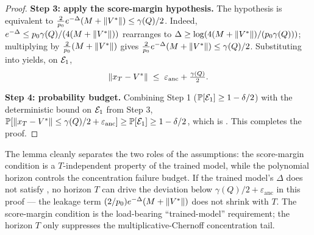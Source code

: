\begin{proof}
\noindent\textbf{Step 3: apply the score-margin hypothesis.}
The hypothesis  is equivalent to
$\tfrac{2}{p_0} e^{-\Delta}(M + \left\| V^* \right\|) \le \gamma(Q)/2$.
Indeed,
$e^{-\Delta} \le p_0 \gamma(Q) / (4(M + \left\| V^* \right\|))$ rearranges to
$\Delta \ge \log(4(M + \left\| V^* \right\|)/(p_0 \gamma(Q)))$; multiplying by
$\tfrac{2}{p_0}(M + \left\| V^* \right\|)$ gives
$\tfrac{2}{p_0} e^{-\Delta}(M + \left\| V^* \right\|) \le \gamma(Q)/2$.
Substituting into  yields, on $\mathcal{E}_1$,
\begin{align*}
   \left\| x_T - V^* \right\|
   \;\le\; \varepsilon_{\mathrm{anc}} + \tfrac{\gamma(Q)}{2}.
\end{align*}

\noindent\textbf{Step 4: probability budget.}
Combining Step 1 ($\mathbb{P}[\mathcal{E}_1] \ge 1 - \delta/2$) with the
deterministic bound on $\mathcal{E}_1$ from Step 3,
$\mathbb{P}[\left\| x_T - V^* \right\| \le \gamma(Q)/2 + \varepsilon_{\mathrm{anc}}]
\ge \mathbb{P}[\mathcal{E}_1] \ge 1 - \delta/2$, which is
. This completes the proof.
\end{proof}

\begin{remark}\label{rem:T_polynomial_remark}
The lemma cleanly separates the two roles of the assumptions: the
score-margin condition  is a $T$-independent
property of the trained model, while the polynomial horizon
 controls the concentration failure budget.
If the trained model's $\Delta$ does not satisfy
, no horizon $T$ can drive the deviation below
$\gamma(Q)/2 + \varepsilon_{\mathrm{anc}}$ in this proof --- the leakage
term $(2/p_0) e^{-\Delta}(M + \left\| V^* \right\|)$ does not shrink with $T$. The
score-margin condition is the load-bearing ``trained-model''
requirement; the horizon $T$ only suppresses the multiplicative-Chernoff
concentration tail.
\end{remark}

